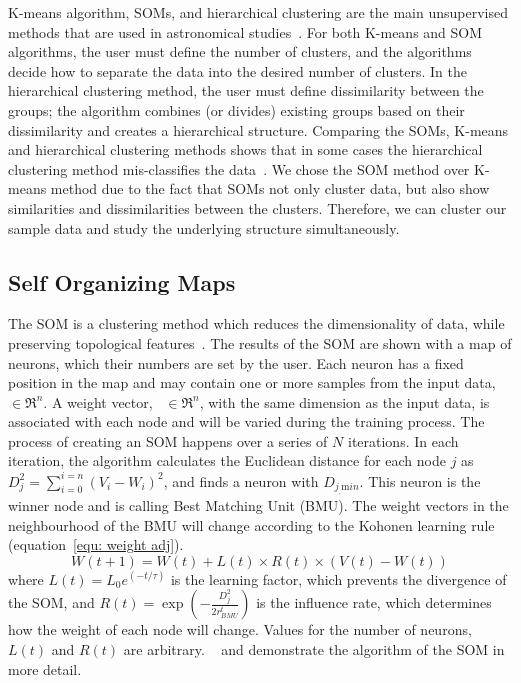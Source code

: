 K-means algorithm, SOMs, and hierarchical clustering are the main unsupervised methods that are used in astronomical studies~\citep[e.g.][]{DAbrusco12, Aycha16}. %
For both K-means and SOM algorithms, the user must define the number of clusters, and the algorithms decide how to separate the data into the desired number of clusters.
In the hierarchical clustering method, the user must define dissimilarity between the groups; the algorithm combines (or divides) existing groups based on their dissimilarity and creates a hierarchical structure. 
Comparing the SOMs, K-means and hierarchical clustering methods shows that in some cases the hierarchical clustering method mis-classifies the data~\citep[][and references therein]{Mangiameli96}.
We chose the SOM method over K-means method due to the fact that SOMs not only cluster data, but also show similarities and dissimilarities between the clusters.
Therefore, we can cluster our sample data and study the underlying structure simultaneously.

 \subsection{Self Organizing Maps}
 \label{sec: som}
 The SOM is a clustering method which reduces the dimensionality of data, while preserving topological features~\citep{Kohonen98}. 
 The results of the SOM are shown with a map of neurons, which their numbers are set by the user.
 Each neuron has a fixed position in the map and may contain one or more samples from the input data,~ $\in \Re^n$. %
 A weight vector,~ $\in \Re^n$, with the same dimension as the input data, is associated with each node and will be varied during the training process.
 The process of creating an SOM happens over a series of $N$ iterations.
 In each iteration, the algorithm calculates the Euclidean distance for each node $j$ as $D_j^2= \sum_{i=0}^{i=n} (V_i - W_i)^2$, and finds a neuron with $D_{j_,{\mathrm min}}$. 
 This neuron is the winner node and is calling Best Matching Unit (BMU). 
 The weight vectors in the neighbourhood of the BMU will change according to the Kohonen learning rule (equation~\ref{equ: weight adj}). 
  \begin{equation}
            \label{equ: weight adj}
            W(t+1)=W(t)+L(t) \times R(t) \times(V(t)-W(t))
 \end{equation}
where $L(t) = L_0 e^{(-t/\tau)}$ is the learning factor, which prevents the divergence of the SOM, and $R(t)=\exp(-\frac{D_j^2}{2r^t_{BMU}})$ is the influence rate, which determines how the weight of each node will change.
Values for the number of neurons, $L(t)$ and $R(t)$ are arbitrary. 
~\cite{Geach12} and \cite{Rahmani16b} demonstrate the algorithm of the SOM in more detail.



